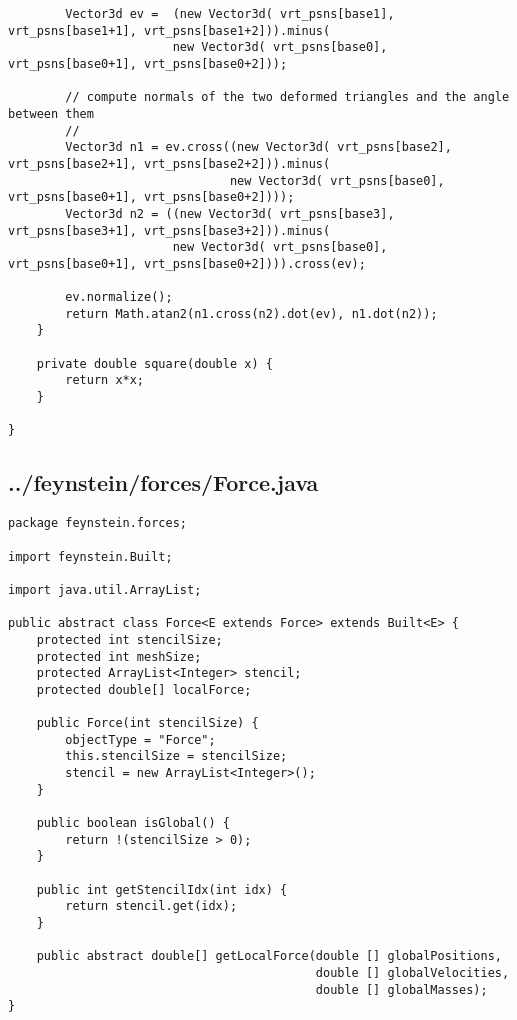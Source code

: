 \begin{lstlisting}
		Vector3d ev =  (new Vector3d( vrt_psns[base1], vrt_psns[base1+1], vrt_psns[base1+2])).minus(
					   new Vector3d( vrt_psns[base0], vrt_psns[base0+1], vrt_psns[base0+2]));
		
		// compute normals of the two deformed triangles and the angle between them
		//
		Vector3d n1 = ev.cross((new Vector3d( vrt_psns[base2], vrt_psns[base2+1], vrt_psns[base2+2])).minus(
							   new Vector3d( vrt_psns[base0], vrt_psns[base0+1], vrt_psns[base0+2])));
		Vector3d n2 = ((new Vector3d( vrt_psns[base3], vrt_psns[base3+1], vrt_psns[base3+2])).minus(
					   new Vector3d( vrt_psns[base0], vrt_psns[base0+1], vrt_psns[base0+2]))).cross(ev);
		
		ev.normalize();
		return Math.atan2(n1.cross(n2).dot(ev), n1.dot(n2));
	}
	
	private double square(double x) {
		return x*x;
	}
	
}
\end{lstlisting}

\subsection*{../feynstein/forces/Force.java}
\begin{lstlisting}
package feynstein.forces;

import feynstein.Built;

import java.util.ArrayList;

public abstract class Force<E extends Force> extends Built<E> {
	protected int stencilSize;
	protected int meshSize;
	protected ArrayList<Integer> stencil;
	protected double[] localForce;
	
    public Force(int stencilSize) {
		objectType = "Force";
		this.stencilSize = stencilSize;
		stencil = new ArrayList<Integer>();
	}
	
	public boolean isGlobal() {
		return !(stencilSize > 0); 
	}
	
	public int getStencilIdx(int idx) {
		return stencil.get(idx);
	}
	
	public abstract double[] getLocalForce(double [] globalPositions,
										   double [] globalVelocities,
										   double [] globalMasses);
}\end{lstlisting}

